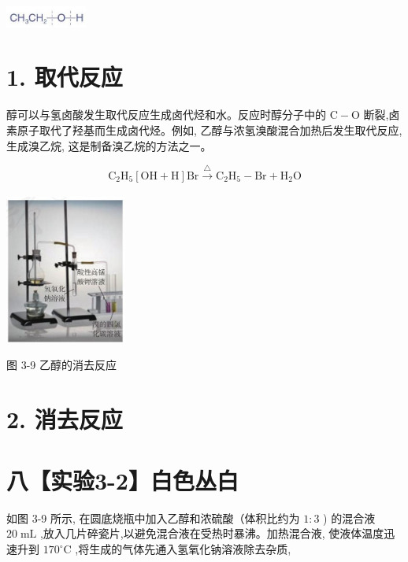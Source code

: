 \documentclass[10pt]{article}
\begin{document}
\begin{center}
\includegraphics[max width=0.2\textwidth]{images/0190efc5-b58a-7c43-bfb0-e0a030df9cfd_66_669900.jpg}
\end{center}

\section*{1. 取代反应}

醇可以与氢卤酸发生取代反应生成卤代烃和水。反应时醇分子中的 \(\mathrm{C} - \mathrm{O}\) 断裂,卤素原子取代了羟基而生成卤代烃。例如, 乙醇与浓氢溴酸混合加热后发生取代反应, 生成溴乙烷, 这是制备溴乙烷的方法之一。

\[
{\mathrm{C}}_{2}{\mathrm{H}}_{5}\left\lbrack {\mathrm{{OH}} + \mathrm{H}}\right\rbrack \mathrm{{Br}}\xrightarrow[]{\bigtriangleup }{\mathrm{C}}_{2}{\mathrm{H}}_{5} - \mathrm{{Br}} + {\mathrm{H}}_{2}\mathrm{O}
\]

\begin{center}
\includegraphics[max width=0.3\textwidth]{images/0190efc5-b58a-7c43-bfb0-e0a030df9cfd_66_902703.jpg}
\end{center}

图 3-9 乙醇的消去反应

\section*{2. 消去反应}

\section*{八【实验3-2】白色丛白}

如图 3-9 所示, 在圆底烧瓶中加入乙醇和浓硫酸（体积比约为 \(1 : 3\) ) 的混合液 \({20}\mathrm{\;{mL}}\) ,放入几片碎瓷片,以避免混合液在受热时暴沸。加热混合液, 使液体温度迅速升到 \({170}^{ \circ }\mathrm{C}\) ,将生成的气体先通入氢氧化钠溶液除去杂质,
\end{document}
